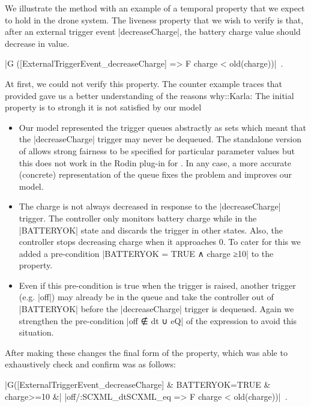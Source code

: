 We illustrate the method with an example of a temporal property that we expect to hold in the drone \SCXML system. 
The liveness property that we wish to  verify is that, after an external trigger event |decreaseCharge|, the battery charge value should  decrease in value.
\begin{center}
  |G ([ExternalTriggerEvent_decreaseCharge] => F {charge < old(charge)})|~.
\end{center}
At first, we could not verify this property.
The counter example traces that \PROB provided gave us a better understanding of the reasons why:\todo:{Karla: The initial property is to strongh it is not satisfied by our model}
\begin{itemize}
\item
Our model represented the trigger queues abstractly as sets which meant that the |decreaseCharge| trigger may never be dequeued.
The standalone version of \PROB allows strong fairness to be specified for particular parameter values but this does not work in the Rodin plug-in for \PROB. 
In any case, a more accurate (concrete) representation of the queue fixes the problem and improves our model.
\item 
The charge is not always decreased in response to the |decreaseCharge| trigger.
The controller only monitors battery charge while in the |BATTERYOK| state and discards the trigger in other states.
Also, the controller stops decreasing charge when it approaches 0. 
To cater for this we added a pre-condition |BATTERYOK = TRUE ∧ charge ≥10| to the \LTL property.
\item
Even if this pre-condition is true when the trigger is raised, another trigger (e.g. |off|) may already be in the queue and take the controller out of |BATTERYOK| before the |decreaseCharge| trigger is dequeued.
Again we strengthen the pre-condition |off ∉ dt ∪ eQ| of the \LTL expression to avoid this situation.
\end{itemize}
After making these changes the final form of the \LTL property, which \PROB was able to exhaustively check and confirm was as follows:
\begin{center}
	|G([ExternalTriggerEvent_decreaseCharge] & {BATTERYOK=TRUE & charge>=10 &|
		|off/:SCXML_dt\/SCXML_eq} => F {charge < old(charge)})|~.
\end{center}


